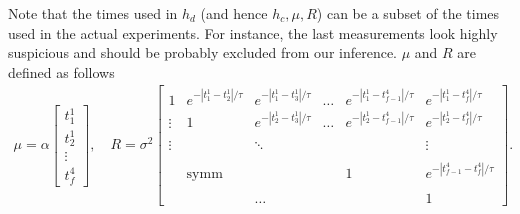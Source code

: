 \documentclass{article}
\begin{document}
Note that the times used in $h_d$ (and hence $h_c, \mu, R$) can be a
subset of the times used in the actual experiments. For instance, the
last measurements look highly suspicious and should be probably excluded
from our inference. 
$\mu$ and $R$ are defined as follows 
\begin{align*}
 \mu = \alpha
 \begin{bmatrix}
  t_1^1 \\
  t_2^1 \\
  \vdots \\
  t_f^4
 \end{bmatrix}, \quad R = \sigma^2
 \begin{bmatrix}
  1 & e^{-|t_1^1 - t_2^1|/\tau} & e^{-|t_1^1 - t_3^1|/\tau} &  \ldots &
  e^{-|t_1^1 - t_{f-1}^4|/\tau} & e^{-|t_1^1-t_f^4|/\tau} \\ 
\vdots & 1 & e^{-|t_2^1 - t_3^1|/\tau} &   \ldots & e^{-|t_2^1 -
  t_{f-1}^4|/\tau} & e^{-|t_2^1 - t_f^4|/\tau} \\ 
\\ 
\vdots &  &  \ddots & &  & \vdots \\
\\
& \text{symm} & & & 1 & e^{-|t_{f-1}^4 - t_f^4|/\tau}  \\
\\
& & \ldots & & & 1
 \end{bmatrix}.
\end{align*}
\end{document}
